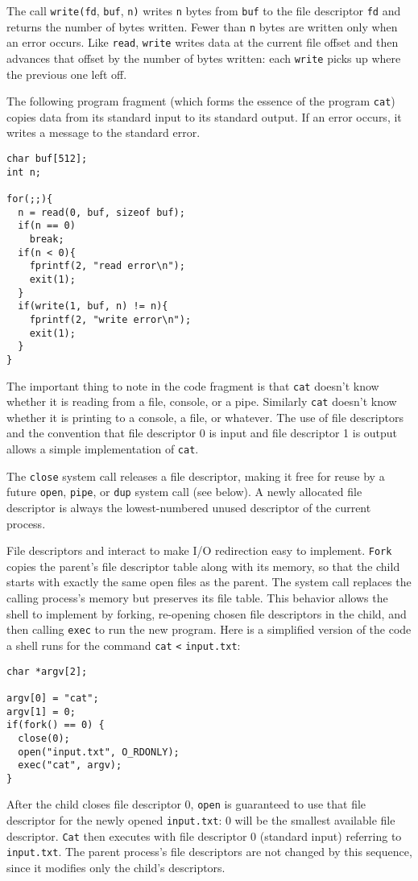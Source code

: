 The call
\lstinline{write(fd},
\lstinline{buf},
\lstinline{n)}
writes
\lstinline{n}
bytes from
\lstinline{buf}
to the file descriptor
\lstinline{fd}
and returns the number of bytes written.
Fewer than
\lstinline{n}
bytes are written only when an error occurs.
Like
\lstinline{read},
\lstinline{write}
writes data at the current file offset and then advances
that offset by the number of bytes written:
each
\lstinline{write}
picks up where the previous one left off.

The following program fragment (which forms the essence of the program
\lstinline{cat})
copies data from its standard input
to its standard output.  If an error occurs, it writes a message
to the standard error.
\begin{lstlisting}[]
char buf[512];
int n;

for(;;){
  n = read(0, buf, sizeof buf);
  if(n == 0)
    break;
  if(n < 0){
    fprintf(2, "read error\n");
    exit(1);
  }
  if(write(1, buf, n) != n){
    fprintf(2, "write error\n");
    exit(1);
  }
}
\end{lstlisting}
The important thing to note in the code fragment is that
\lstinline{cat}
doesn't know whether it is reading from a file, console, or a pipe.
Similarly 
\lstinline{cat}
doesn't know whether it is printing to a console, a file, or whatever.
The use of file descriptors and the convention that file descriptor 0
is input and file descriptor 1 is output allows a simple
implementation
of 
\lstinline{cat}.

The
\lstinline{close}
system call
releases a file descriptor, making it free for reuse by a future
\lstinline{open},
\lstinline{pipe},
or
\lstinline{dup}
system call (see below).
A newly allocated file descriptor 
is always the lowest-numbered unused
descriptor of the current process.

File descriptors and
interact to make I/O redirection easy to implement.
\lstinline{Fork}
copies the parent's file descriptor table along with its memory,
so that the child starts with exactly the same open files as the parent.
The system call
replaces the calling process's memory but preserves its file table.
This behavior allows the shell to
implement  by forking,
re-opening chosen file descriptors in the child,
and then calling \lstinline{exec} to run the new program.
Here is a simplified version of the code a shell runs for the
command
\lstinline{cat}
\lstinline{<}
\lstinline{input.txt}:
\begin{lstlisting}[]
char *argv[2];

argv[0] = "cat";
argv[1] = 0;
if(fork() == 0) {
  close(0);
  open("input.txt", O_RDONLY);
  exec("cat", argv);
}
\end{lstlisting}
After the child closes file descriptor 0,
\lstinline{open}
is guaranteed to use that file descriptor
for the newly opened
\lstinline{input.txt}:
0 will be the smallest available file descriptor.
\lstinline{Cat}
then executes with file descriptor 0 (standard input) referring to
\lstinline{input.txt}.
The parent process's file descriptors are not changed by this
sequence, since it modifies only the child's descriptors.

